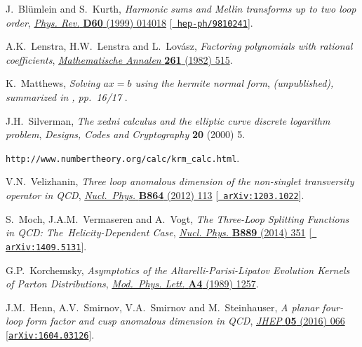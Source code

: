 \documentclass[12pt]{article}
\begin{document}
{\begin{thebibliography}{100}
J.~Bl{\"u}mlein and S.~Kurth, \emph{{Harmonic sums and Mellin transforms up to
  two loop order}},
  \href{https://dx.doi.org/10.1103/PhysRevD.60.014018}{\emph{Phys. Rev.} {\bf
  D60} (1999) 014018} [\href{https://arxiv.org/abs/hep-ph/9810241}{{\tt
  hep-ph/9810241}}].

A.K.~Lenstra, H.W.~Lenstra and L.~Lov{\'a}sz, \emph{Factoring polynomials with
  rational coefficients},
  \href{https://dx.doi.org/10.1007/BF01457454}{\emph{Mathematische Annalen}
  {\bf 261} (1982) 515}.

K.~Matthews, \emph{Solving $ax = b$ using the hermite normal form},
  {\emph{(unpublished), summarized in \cite{DBLP:journals/dcc/Silverman00},
  pp.~16/17} }.

J.H.~Silverman, \emph{The xedni calculus and the elliptic curve discrete
  logarithm problem}, {\emph{Designs, Codes and Cryptography} {\bf 20} (2000)
  5}.

{\tt http://www.numbertheory.org/calc/krm\_calc.html}.

V.N.~Velizhanin, \emph{{Three loop anomalous dimension of the non-singlet
  transversity operator in QCD}},
  \href{https://dx.doi.org/10.1016/j.nuclphysb.2012.06.010}{\emph{Nucl.~Phys.}
  {\bf B864} (2012) 113} [\href{https://arxiv.org/abs/1203.1022}{{\tt
  arXiv:1203.1022}}].

S.~Moch, J.A.M.~Vermaseren and A.~Vogt, \emph{{The Three-Loop Splitting
  Functions in QCD: The~Helicity-Dependent Case}},
  \href{https://dx.doi.org/10.1016/j.nuclphysb.2014.10.016}{\emph{Nucl. Phys.}
  {\bf B889} (2014) 351} [\href{https://arxiv.org/abs/1409.5131}{{\tt
  arXiv:1409.5131}}].

G.P.~Korchemsky, \emph{{Asymptotics of the Altarelli-Parisi-Lipatov Evolution
  Kernels of Parton Distributions}},
  \href{https://dx.doi.org/10.1142/S0217732389001453}{\emph{Mod.~Phys. Lett.}
  {\bf A4} (1989) 1257}.

J.M.~Henn, A.V.~Smirnov, V.A.~Smirnov and M.~Steinhauser, \emph{{A planar
  four-loop form factor and cusp anomalous dimension in QCD}},
  \href{https://dx.doi.org/10.1007/JHEP05(2016)066}{\emph{JHEP} {\bf 05} (2016)
  066} [\href{https://arxiv.org/abs/1604.03126}{{\tt arXiv:1604.03126}}].


\end{thebibliography}}
\end{document}
